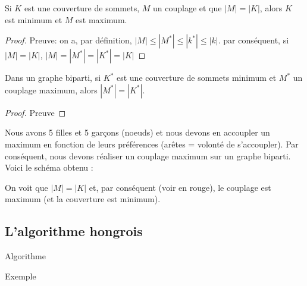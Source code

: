 \begin{mylem}
  Si $K$ est une couverture de sommets, $M$ un couplage et que $|M| = |K|$, alors $K$ est minimum et $M$ est maximum.
  \begin{proof}
     Preuve: on a, par définition, $|M| \leq |M^*| \leq |k^*| \leq |k|$. par conséquent, si $|M| = |K|$, $|M| = |M^*| = |K^*| = |K|$
  \end{proof}
\end{mylem}

\begin{mytheo} [König]
  Dans un graphe biparti, si $K^*$ est une couverture de sommets minimum et $M^*$ un couplage maximum, alors $|M^*| = |K^*|$.
  \begin{proof}
     Preuve \addTODO
  \end{proof}
\end{mytheo}

\begin{myexem}
	Nous avons 5 filles et 5 garçons (noeuds) et nous devons en accoupler un maximum en fonction de leurs préférences (arêtes = volonté de s'accoupler). Par conséquent, nous devons réaliser un couplage maximum sur un graphe biparti. Voici le schéma obtenu :
	\begin{center}
  \end{center}
On voit que $|M|=|K|$ et, par conséquent (voir en rouge), le couplage est maximum (et la couverture est minimum).
\end{myexem}

\subsection{L'algorithme hongrois}
\begin{myalgo}
  Algorithme \addTODO
\end{myalgo}
\begin{myexem}
  Exemple \addTODO
\end{myexem}
